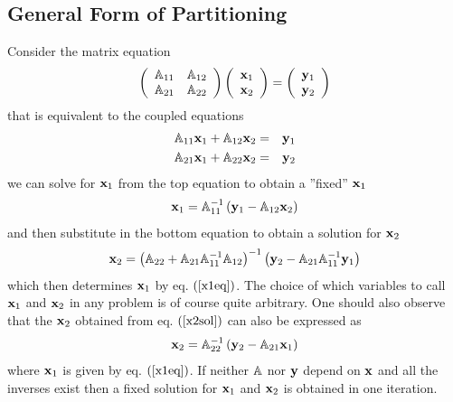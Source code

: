                       

\subsection{General Form of Partitioning}

Consider the matrix equation 
\begin{equation}
\left( 
\begin{array}{cc}
{\Bbb A}_{11} & {\Bbb A}_{12} \\ 
{\Bbb A}_{21} & {\Bbb A}_{22}%
\end{array}%
\right) \left( 
\begin{array}{c}
{\bf x}_{1} \\ 
{\bf x}_{2}%
\end{array}%
\right) =\left( 
\begin{array}{c}
{\bf y}_{1} \\ 
{\bf y}_{2}%
\end{array}%
\right)  \label{ME1}
\end{equation}%
that is equivalent to the coupled equations 
\begin{eqnarray}
{\Bbb A}_{11}{\bf x}_{1}+{\Bbb A}_{12}{\bf x}_{2} &=&{\bf y}_{1}  \nonumber
\\
{\Bbb A}_{21}{\bf x}_{1}+{\Bbb A}_{22}{\bf x}_{2} &=&{\bf y}_{2}
\end{eqnarray}%
we can solve for ${\bf x}_{1}$ from the top equation to obtain a ''fixed'' $%
{\bf x}_{1}$ 
\begin{equation}
{\bf x}_{1}={\Bbb A}_{11}^{-1}\left( {\bf y}_{1}-{\Bbb A}_{12}{\bf x}%
_{2}\right)  \label{x1eq}
\end{equation}%
and then substitute in the bottom equation to obtain a solution for ${\bf x}%
_{2}$ 
\begin{equation}
{\bf x}_{2}=\left( {\Bbb A}_{22}+{\Bbb A}_{21}{\Bbb A}_{11}^{-1}{\Bbb A}%
_{12}\right) ^{-1}\left( {\bf y}_{2}-{\Bbb A}_{21}{\Bbb A}_{11}^{-1}{\bf y}%
_{1}\right)  \label{x2sol}
\end{equation}%
which then determines ${\bf x}_{1}$ by eq. $\left( \ref{x1eq}\right) $. The
choice of which variables to call ${\bf x}_{1}$ and ${\bf x}_{2}$ in any
problem is of course quite arbitrary. One should also observe that the ${\bf %
x}_{2}$ obtained from eq. $\left( \ref{x2sol}\right) $ can also be expressed
as 
\begin{equation}
{\bf x}_{2}={\Bbb A}_{22}^{-1}\left( {\bf y}_{2}-{\Bbb A}_{21}{\bf x}%
_{1}\right)  \label{x2leq}
\end{equation}%
where ${\bf x}_{1}$ is given by eq. $\left( \ref{x1eq}\right) $. If neither $%
{\Bbb A}$ nor ${\bf y}$ depend on ${\bf x}$ and all the inverses exist then
a fixed solution for ${\bf x}_{1}$ and ${\bf x}_{2}$ is obtained in one
iteration.

